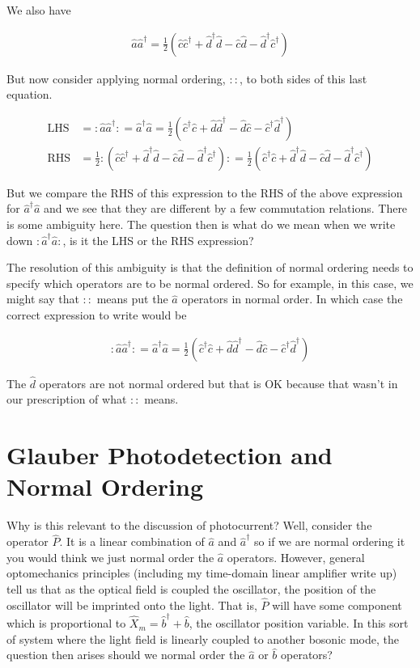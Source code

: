 \documentclass[12pt]{article}
\newcommand{\ahat}{\hat{a}}
\newcommand{\adag}{\ahat^{\dag}}
\begin{document}
We also have

\begin{align}
\ahat\adag = \frac{1}{2}(\hat{c}\hat{c}^{\dag}+\hat{d}^{\dag} \hat{d} - \hat{c}\hat{d} - \hat{d}^{\dag} \hat{c}^{\dag})
\end{align}

But now consider applying normal ordering, $::$, to both sides of this last equation.

\begin{align}
\text{LHS} &= :\ahat\adag: = \adag\ahat = \frac{1}{2}(\hat{c}^{\dag}\hat{c} + \hat{d}\hat{d}^{\dag} - \hat{d}\hat{c} -\hat{c}^{\dag}\hat{d}^{\dag})\\
\text{RHS} &= \frac{1}{2}:(\hat{c}\hat{c}^{\dag}+\hat{d}^{\dag} \hat{d} - \hat{c}\hat{d} - \hat{d}^{\dag} \hat{c}^{\dag}): = \frac{1}{2}(\hat{c}^{\dag} \hat{c}+\hat{d}^{\dag}\hat{d} - \hat{c}\hat{d} - \hat{d}^{\dag}\hat{c}^{\dag})
\end{align}

But we compare the RHS of this expression to the RHS of the above expression for $\adag\ahat$ and we see that they are different by a few commutation relations. There is some ambiguity here. The question then is what do we mean when we write down $:\adag\ahat:$, is it the LHS or the RHS expression?

The resolution of this ambiguity is that the definition of normal ordering needs to specify which operators are to be normal ordered. So for example, in this case, we might say that $::$ means put the $\ahat$ operators in normal order. In which case the correct expression to write would be 

\begin{align}
:\ahat\adag: = \adag\ahat = \frac{1}{2}(\hat{c}^{\dag}\hat{c} + \hat{d}\hat{d}^{\dag} - \hat{d}\hat{c} -\hat{c}^{\dag}\hat{d}^{\dag})
\end{align}

The $\hat{d}$ operators are not normal ordered but that is OK because that wasn't in our prescription of what $::$ means. 


\section{Glauber Photodetection and Normal Ordering}
Why is this relevant to the discussion of photocurrent? Well, consider the operator $\hat{P}$. It is a linear combination of $\ahat$ and $\adag$ so if we are normal ordering it you would think we just normal order the $\ahat$ operators. However, general optomechanics principles (including my time-domain linear amplifier write up) tell us that as the optical field is coupled the oscillator, the position of the oscillator will be imprinted onto the light. That is, $\hat{P}$ will have some component which is proportional to $\hat{X}_m = \hat{b}^{\dag}+\hat{b}$, the oscillator position variable. In this sort of system where the light field is linearly coupled to another bosonic mode, the question then arises should we normal order the $\ahat$ or $\hat{b}$ operators?
\end{document}
